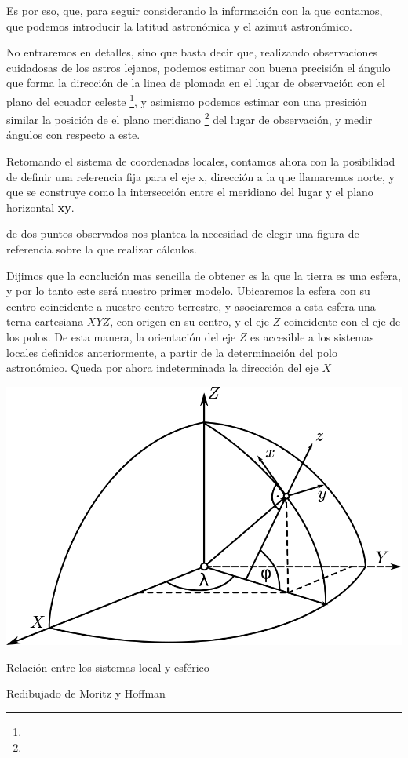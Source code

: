 \documentclass{tufte-book}
\begin{document}
Es por eso, que, para seguir considerando la información con la que contamos, que podemos introducir
la latitud astronómica y el azimut astronómico.

No entraremos en detalles, sino que basta decir que, realizando observaciones cuidadosas de los astros
lejanos, podemos estimar con buena precisión el ángulo que forma la dirección de la linea de plomada en
el lugar de observación con el plano del ecuador celeste \footnote{}, y asimismo podemos estimar con una
presición similar la posición de el plano meridiano \footnote{} del lugar de observación, y medir
ángulos con respecto a este.

Retomando el sistema de coordenadas locales, contamos ahora con la posibilidad de definir una referencia
fija para el eje x, dirección a la que llamaremos norte, y que se construye como la intersección entre
el meridiano del lugar y el plano horizontal \textbf{xy}.

 de dos puntos observados nos plantea la necesidad
de elegir una figura de referencia sobre la que realizar cálculos.

Dijimos que la conclución mas sencilla de obtener es la que la tierra es una esfera, y por lo tanto este
será nuestro primer modelo. Ubicaremos la esfera con su centro coincidente a nuestro centro terrestre,
y asociaremos a esta esfera una terna cartesiana \(XYZ\), con origen en su centro, y el eje \(Z\) coincidente con
el eje de los polos. De esta manera, la orientación del eje \(Z\) es accesible a los sistemas locales
definidos anteriormente, a partir de la determinación del polo astronómico. Queda por ahora indeterminada
la dirección del eje \(X\)

\begin{marginfigure}
  \label{fig:sistemas}
  \includegraphics{./imgs/sistemas.png}
  \caption{Relación entre los sistemas local y esférico}
  \scriptsize Redibujado de Moritz y Hoffman
\end{marginfigure}
\end{document}
